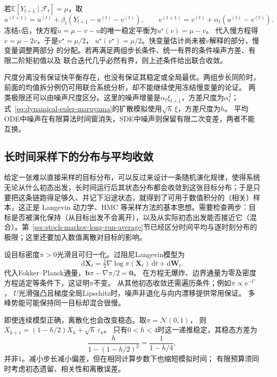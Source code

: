 \begin{example}[分解同一个未知均值的快慢更新]
  \label{ex:stoch-two-timescale-mean-splitting}
  若$\mathbb E[Y_{t+1}\mid\mathcal F_t]=\mu$，取
  \[
    u^{(t+1)}=u^{(t)}+\beta_t(Y_{t+1}-u^{(t)}-v^{(t)}),\qquad
    v^{(t+1)}=v^{(t)}+\alpha_t(u^{(t)}-v^{(t)}).
  \]
  冻结$v$后，快方程$\dot u=\mu-v-u$的唯一稳定平衡为$u^\star(v)=\mu-v$。
  代入慢方程得$\dot v=\mu-2v$，于是$v^\star=\mu/2$，
  $u^\star(v^\star)=\mu/2$。快变量估计尚未被$v$解释的部分，慢变量调整两部分
  的分配。若再满足两组步长条件、统一有界的条件噪声方差、有限二阶矩初值以及
  联合迭代几乎必然有界，则上述条件给出联合收敛。
\end{example}
尺度分离没有保证快平衡存在，也没有保证其稳定或全局最优。两组步长同阶时，
前面的均值拆分例仍可用联合系统分析，却不能继续使用冻结慢变量的论证。
两类极限还可以由噪声尺度区分。这里的噪声增量是$\alpha_t\xi_{t+1}$，方差尺度为$\alpha_t^2$；式~\eqref{eq:dynamical-euler-maruyama}的扩散模拟使用$\sqrt h\,\xi$，方差尺度为$h$。
平均ODE中噪声在有限算法时间窗消失，SDE中噪声则保留有限二次变差，两者不能互换。

\subsection{长时间采样下的分布与平均收敛}
给定一张难以直接采样的目标分布，可以反过来设计一条随机演化规律，使得系统无论从什么初态出发，长时间运行后其状态分布都会收敛到这张目标分布；于是只要把这条链跑得足够久、并记下沿途状态，就得到了可用于数值积分的（相关）样本，这正是 Langevin 动力学、HMC 等采样方法的基本思想。需要检查两步：目标是否被演化保持（从目标出发不会离开），以及从实际初态出发能否接近它（混合）。第~\ref{sec:stoch-markov-long-run-average}节已经区分时间平均与逐时刻分布的极限；这里还要加入数值离散对目标的影响。

设目标密度$\pi>0$光滑且可归一化。过阻尼Langevin模型为
\begin{equation}
 \mathrm d\bm X_t=\tfrac12\nabla\log\pi(\bm X_t)\,\mathrm dt+\mathrm d\bm W_t.
 \label{eq:dynamical-langevin-sde}
\end{equation}
代入Fokker--Planck通量，$\bm b\pi-\nabla\pi/2=\bm0$。
在方程无爆炸、边界通量为零及密度方程适定等条件下，这证明$\pi$不变。
从其他初态收敛还需遍历条件；例如$\pi\propto\mathrm e^{-U}$，
$U$光滑强凸且梯度全局Lipschitz时，噪声非退化与向内漂移提供常用保证。
多峰势能可能保持同一目标却混合很慢。

即使连续模型正确，离散化也会改变稳态。取$\pi=\mathcal N(0,1)$，
则$X_{k+1}=(1-h/2)X_k+\sqrt h\,\varepsilon_k$。
只有$0<h<4$时这一递推稳定，其稳态方差为
\[
  \frac{h}{1-(1-h/2)^2}=\frac1{1-h/4},
\]
并非$1$。减小步长减小偏差，但在相同计算步数下也缩短模拟时间；
有限预算须同时考虑初态遗留、相关性和离散误差。

